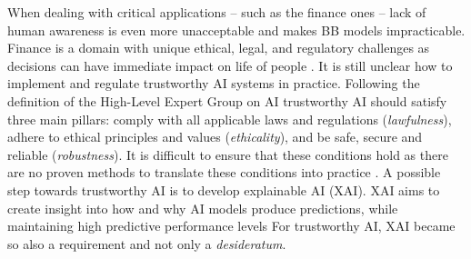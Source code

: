 \documentclass[sigconf]{acmart}
\begin{document}
When dealing with critical applications -- such as the finance ones -- lack of human awareness is even more unacceptable and makes BB models impracticable. 
%
Finance is a domain with unique ethical, legal, and regulatory challenges as decisions can have immediate impact on life of people \cite{weiss2021business}. 
%
It is still unclear how to implement and regulate trustworthy AI systems in practice. Following the definition of the High-Level Expert Group on AI \cite{egtai} trustworthy AI should satisfy three main pillars: comply with all applicable laws and regulations (\emph{lawfulness}), adhere to ethical principles and values (\emph{ethicality}), and be safe, secure and reliable (\emph{robustness}). It is difficult to ensure that these conditions hold as there are no proven methods to translate these conditions into practice \cite{mittelstadt2019principles}.
%
A possible step towards trustworthy AI is to develop explainable AI (XAI). XAI aims to create insight into how and why AI models produce predictions, while maintaining high predictive performance levels
%
For trustworthy AI, XAI became so also a requirement and not only a \emph{desideratum}.

%
%
%
%
%
%
\end{document}

